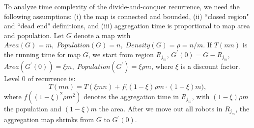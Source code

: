%


To analyze time complexity of the divide-and-conquer recurrence, we need the following assumptions:
(i) the map is connected and bounded, 
(ii) ``closed region" and ``dead end" definitions, 
and (iii) aggregation time is proportional to map area and population. 
Let $G$ denote a map with $Area(G) = m,\; Population(G) = n,\; Density(G) = \rho=n/m$.
If $T(mn)$ is the running time for map $G$, we start from region $R_{j_m}$, $G^{\prime}(0) = G-R_{j_m}$, $Area(G^{\prime}(0))=\xi m, \;Population(G^{\prime})=\xi\rho m$, where $\xi$ is a discount factor. 
Level 0 of recurrence is:
\begin{equation}\label{DC} 
T(mn) = T(\xi mn)+f\big((1-\xi)\rho m\cdot (1-\xi)m\big),
\end{equation}
where $f((1-\xi)^2\rho m^2)$ denotes the aggregation time in $R_{j_m}$, with $(1-\xi)\rho m$ the population and $(1-\xi)m$ the area. After we move out all robots in $R_{j_m}$, the aggregation map shrinks from $G$ to $G^{\prime}(0)$.

